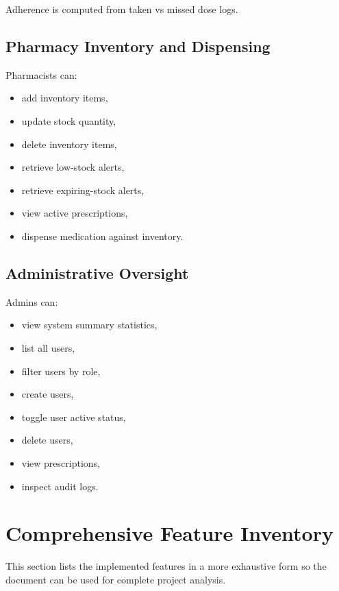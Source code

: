 \documentclass[12pt,a4paper]{article}
\begin{document}
Adherence is computed from taken vs missed dose logs.

\subsection{Pharmacy Inventory and Dispensing}
Pharmacists can:
\begin{itemize}[leftmargin=*]
  \item add inventory items,
  \item update stock quantity,
  \item delete inventory items,
  \item retrieve low-stock alerts,
  \item retrieve expiring-stock alerts,
  \item view active prescriptions,
  \item dispense medication against inventory.
\end{itemize}

\subsection{Administrative Oversight}
Admins can:
\begin{itemize}[leftmargin=*]
  \item view system summary statistics,
  \item list all users,
  \item filter users by role,
  \item create users,
  \item toggle user active status,
  \item delete users,
  \item view prescriptions,
  \item inspect audit logs.
\end{itemize}

\section{Comprehensive Feature Inventory}
This section lists the implemented features in a more exhaustive form so the document can be used for complete project analysis.
\end{document}
